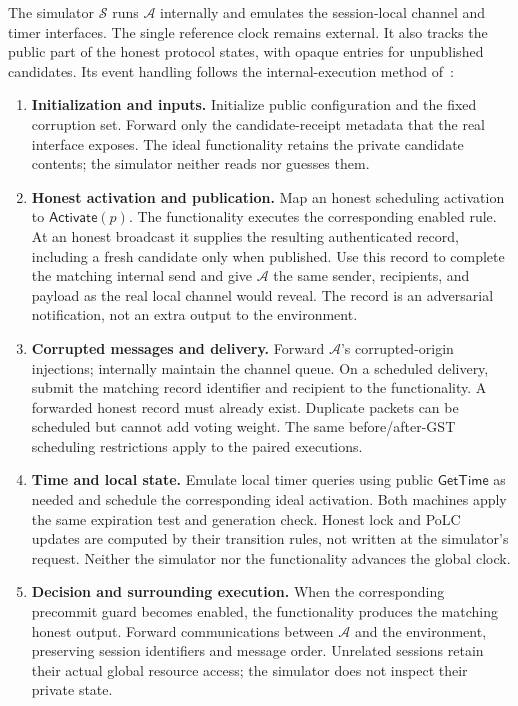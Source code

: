 \documentclass[conference,letterpaper,10pt]{IEEEtran}
\begin{document}
The simulator $\mathcal{S}$ runs $\mathcal{A}$ internally and emulates the session-local channel and timer interfaces. The single reference clock remains external. It also tracks the public part of the honest protocol states, with opaque entries for unpublished candidates. Its event handling follows the internal-execution method of~\cite{canetti2017universally}:
\begin{enumerate}
\item \textbf{Initialization and inputs.} Initialize public configuration and the fixed corruption set. Forward only the candidate-receipt metadata that the real interface exposes. The ideal functionality retains the private candidate contents; the simulator neither reads nor guesses them.
\item \textbf{Honest activation and publication.} Map an honest scheduling activation to $\mathsf{Activate}(p)$. The functionality executes the corresponding enabled rule. At an honest broadcast it supplies the resulting authenticated record, including a fresh candidate only when published. Use this record to complete the matching internal send and give $\mathcal{A}$ the same sender, recipients, and payload as the real local channel would reveal. The record is an adversarial notification, not an extra output to the environment.
\item \textbf{Corrupted messages and delivery.} Forward $\mathcal{A}$'s corrupted-origin injections; internally maintain the channel queue. On a scheduled delivery, submit the matching record identifier and recipient to the functionality. A forwarded honest record must already exist. Duplicate packets can be scheduled but cannot add voting weight. The same before/after-GST scheduling restrictions apply to the paired executions.
\item \textbf{Time and local state.} Emulate local timer queries using public $\mathsf{GetTime}$ as needed and schedule the corresponding ideal activation. Both machines apply the same expiration test and generation check. Honest lock and PoLC updates are computed by their transition rules, not written at the simulator's request. Neither the simulator nor the functionality advances the global clock.
\item \textbf{Decision and surrounding execution.} When the corresponding precommit guard becomes enabled, the functionality produces the matching honest output. Forward communications between $\mathcal{A}$ and the environment, preserving session identifiers and message order. Unrelated sessions retain their actual global resource access; the simulator does not inspect their private state.
\end{enumerate}
\end{document}
